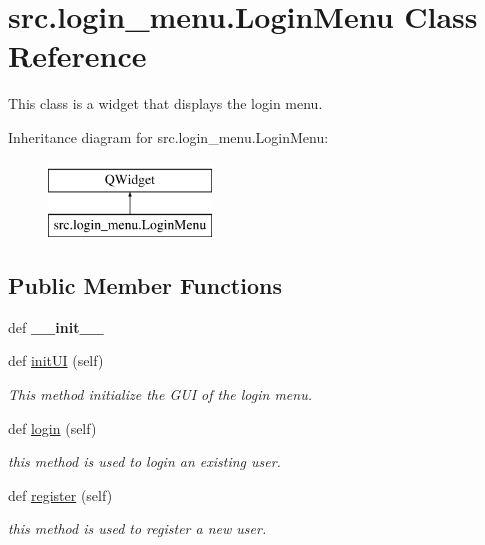 \hypertarget{classsrc_1_1login__menu_1_1_login_menu}{}\section{src.\+login\+\_\+menu.\+Login\+Menu Class Reference}
\label{classsrc_1_1login__menu_1_1_login_menu}


This class is a widget that displays the login menu.  


Inheritance diagram for src.\+login\+\_\+menu.\+Login\+Menu\+:\begin{figure}[H]
\begin{center}
\leavevmode
\includegraphics[height=2.000000cm]{classsrc_1_1login__menu_1_1_login_menu}
\end{center}
\end{figure}
\subsection*{Public Member Functions}
\begin{DoxyCompactItemize}
\item 
\hypertarget{classsrc_1_1login__menu_1_1_login_menu_a33638b382a7b9e5c95163bae3900d5b3}{}def {\bfseries \+\_\+\+\_\+init\+\_\+\+\_\+}\label{classsrc_1_1login__menu_1_1_login_menu_a33638b382a7b9e5c95163bae3900d5b3}

\item 
def \hyperlink{classsrc_1_1login__menu_1_1_login_menu_a5114077865bfc30e8adef2f90cd27d85}{init\+U\+I} (self)
\begin{DoxyCompactList}\small\item\em This method initialize the G\+U\+I of the login menu. \end{DoxyCompactList}\item 
def \hyperlink{classsrc_1_1login__menu_1_1_login_menu_a75303935e17e43388fd4ef3df029944e}{login} (self)
\begin{DoxyCompactList}\small\item\em this method is used to login an existing user. \end{DoxyCompactList}\item 
def \hyperlink{classsrc_1_1login__menu_1_1_login_menu_af6ee6a8dee90f1a94a506400356707ad}{register} (self)
\begin{DoxyCompactList}\small\item\em this method is used to register a new user. \end{DoxyCompactList}\end{DoxyCompactItemize}
